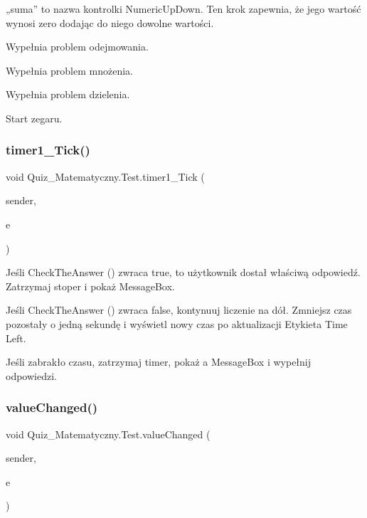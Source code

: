 „suma” to nazwa kontrolki Numeric\+Up\+Down. Ten krok zapewnia, że ​​jego wartość wynosi zero dodając do niego dowolne wartości.

Wypełnia problem odejmowania.

Wypełnia problem mnożenia.

Wypełnia problem dzielenia.

Start zegaru. \mbox{\label{class_quiz___matematyczny_1_1_test_a9224087c42a9beb91c96420f3d4c2507}} 
\subsubsection{\texorpdfstring{timer1\_Tick()}{timer1\_Tick()}}
{\footnotesize\ttfamily void Quiz\+\_\+\+Matematyczny.\+Test.\+timer1\+\_\+\+Tick (\begin{DoxyParamCaption}\item[{object}]{sender,  }\item[{Event\+Args}]{e }\end{DoxyParamCaption})\hspace{0.3cm}{\ttfamily [private]}}

Jeśli Check\+The\+Answer () zwraca true, to użytkownik dostał właściwą odpowiedź. Zatrzymaj stoper i pokaż Message\+Box.

Jeśli Check\+The\+Answer () zwraca false, kontynuuj liczenie na dół. Zmniejsz czas pozostały o jedną sekundę i wyświetl nowy czas po aktualizacji Etykieta Time Left.

Jeśli zabrakło czasu, zatrzymaj timer, pokaż a Message\+Box i wypełnij odpowiedzi. \mbox{\label{class_quiz___matematyczny_1_1_test_a56488f14545a35cd46328ba3b4012ce6}} 
\subsubsection{\texorpdfstring{valueChanged()}{valueChanged()}}
{\footnotesize\ttfamily void Quiz\+\_\+\+Matematyczny.\+Test.\+value\+Changed (\begin{DoxyParamCaption}\item[{object}]{sender,  }\item[{Event\+Args}]{e }\end{DoxyParamCaption})\hspace{0.3cm}{\ttfamily [private]}}

